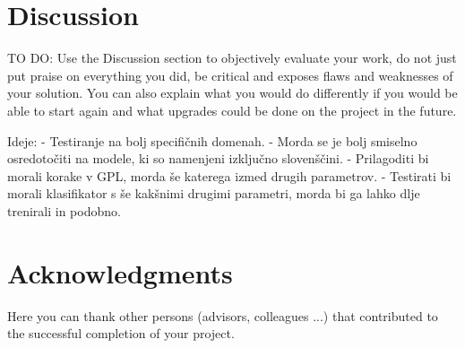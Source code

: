 \documentclass[fleqn,moreauthors,10pt]{ds_report}
\begin{document}



\section*{Discussion}

TO DO:
Use the Discussion section to objectively evaluate your work, do not just put praise on everything you did, be critical and exposes flaws and weaknesses of your solution. You can also explain what you would do differently if you would be able to start again and what upgrades could be done on the project in the future.

Ideje:
- Testiranje na bolj specifičnih domenah.
- Morda se je bolj smiselno osredotočiti na modele, ki so namenjeni izključno slovenščini.
- Prilagoditi bi morali korake v GPL, morda še katerega izmed drugih parametrov.
- Testirati bi morali klasifikator s še kakšnimi drugimi parametri, morda bi ga lahko dlje trenirali in podobno.




\section*{Acknowledgments}

Here you can thank other persons (advisors, colleagues ...) that contributed to the successful completion of your project.




\end{document}
